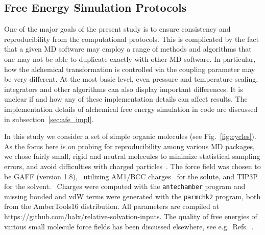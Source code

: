 \documentclass[journal=jctcce,manuscript=article]{achemso}
\newcommand{\progname}[1]{\texttt{#1}}
\begin{document}
\subsection{Free Energy Simulation Protocols}
\label{sec:rafe_protocols}

One of the major goals of the present study is to ensure
consistency and reproducibility from the computational protocols.  This is complicated by the fact
that a given MD software may employ a range of methods and algorithms that one may not be
able to duplicate exactly with other MD software.
In particular, how the alchemical transformation is controlled via the coupling parameter may be very different.
At the most basic level, even pressure and temperature scaling, integrators and other algorithms can also display important differences.
It is unclear if and how any of these implementation details can affect results.
The implementation details of alchemical free energy simulation in code are discussed in subsection~\ref{sec:afe_impl}.

In this study we consider a set of simple organic molecules (see
Fig.~\ref{fig:cycles}).  As the focus here is on probing for
reproducibility among various MD packages, we chose fairly small,
rigid and neutral molecules to minimize statistical sampling errors, and
avoid difficulties with charged
particles~\cite{rocklin_calculating_2013, JCC:JCC1050}.  The force
field was chosen to be GAFF (version
1.8),~\cite{wang_development_2004} utilizing AM1/BCC charges~ for the solute,\cite{jakalian_fast_2000,jakalian_fast_2002} and
TIP3P for the solvent.~\cite{jorgensen_comparison_1983-1}
%
%
%
%
Charges were computed with the \progname{antechamber} program and
missing bonded and vdW terms were generated with the
\progname{parmchk2} program, both from the AmberTools16 distribution.
All parameters are compiled at
https://github.com/halx/relative-solvation-inputs.
The quality of free energies of various small molecule force fields
has been discussed elsewhere, see
e.g.\ Refs.~.
\end{document}
